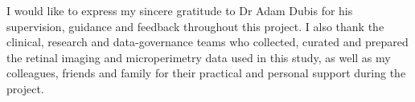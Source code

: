I would like to express my sincere gratitude to Dr Adam Dubis for his supervision, guidance and feedback throughout this project. I also thank the clinical, research and data-governance teams who collected, curated and prepared the retinal imaging and microperimetry data used in this study, as well as my colleagues, friends and family for their practical and personal support during the project.

